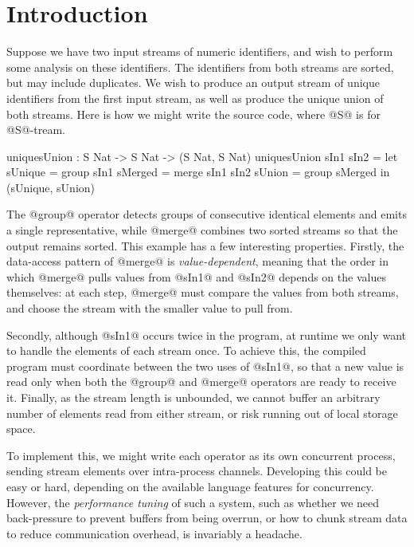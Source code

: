 \section{Introduction}
\label{s:Introduction}

Suppose we have two input streams of numeric identifiers, and wish to perform some analysis on these identifiers. The identifiers from both streams are sorted, but may include duplicates. We wish to produce an output stream of unique identifiers from the first input stream, as well as produce the unique union of both streams. Here is how we might write the source code, where @S@ is for @S@-tream.
\begin{code}
  uniquesUnion : S Nat -> S Nat -> (S Nat, S Nat)
  uniquesUnion sIn1 sIn2
   = let  sUnique = group sIn1
          sMerged = merge sIn1 sIn2
          sUnion  = group sMerged
     in   (sUnique, sUnion)
\end{code}

The @group@ operator detects groups of consecutive identical elements and emits a single representative, while @merge@ combines two sorted streams so that the output remains sorted. This example has a few interesting properties. Firstly, the data-access pattern of @merge@ is \emph{value-dependent}, meaning that the order in which @merge@ pulls values from @sIn1@ and @sIn2@ depends on the values themselves: at each step, @merge@ must compare the values from both streams, and choose the stream with the smaller value to pull from.

Secondly, although @sIn1@ occurs twice in the program, at runtime we only want to handle the elements of each stream once. To achieve this, the compiled program must coordinate between the two uses of @sIn1@, so that a new value is read only when both the @group@ and @merge@ operators are ready to receive it. Finally, as the stream length is unbounded, we cannot buffer an arbitrary number of elements read from either stream, or risk running out of local storage space.

To implement this, we might write each operator as its own concurrent process, sending stream elements over intra-process channels. Developing this could be easy or hard, depending on the available language features for concurrency. However, the \emph{performance tuning} of such a system, such as whether we need back-pressure to prevent buffers from being overrun, or how to chunk stream data to reduce communication overhead, is invariably a headache. 

